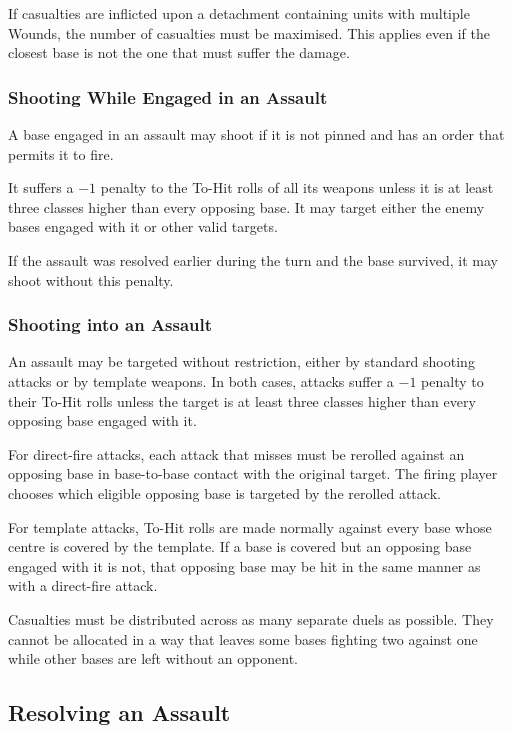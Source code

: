 If casualties are inflicted upon a detachment containing units with multiple Wounds, the number of casualties must be maximised. This applies even if the closest base is not the one that must suffer the damage.

\subsubsection{Shooting While Engaged in an Assault}

A base engaged in an assault may shoot if it is not pinned and has an order that permits it to fire.

It suffers a $-1$ penalty to the To-Hit rolls of all its weapons unless it is at least three classes higher than every opposing base. It may target either the enemy bases engaged with it or other valid targets.

If the assault was resolved earlier during the turn and the base survived, it may shoot without this penalty.

\subsubsection{Shooting into an Assault}

An assault may be targeted without restriction, either by standard shooting attacks or by template weapons. In both cases, attacks suffer a $-1$ penalty to their To-Hit rolls unless the target is at least three classes higher than every opposing base engaged with it.

For direct-fire attacks, each attack that misses must be rerolled against an opposing base in base-to-base contact with the original target. The firing player chooses which eligible opposing base is targeted by the rerolled attack.

For template attacks, To-Hit rolls are made normally against every base whose centre is covered by the template. If a base is covered but an opposing base engaged with it is not, that opposing base may be hit in the same manner as with a direct-fire attack.

Casualties must be distributed across as many separate duels as possible. They cannot be allocated in a way that leaves some bases fighting two against one while other bases are left without an opponent.

\subsection{Resolving an Assault}

